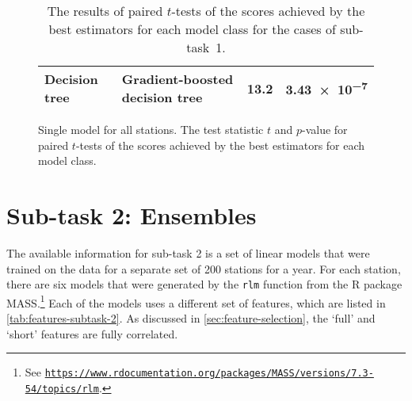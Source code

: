 \documentclass[11pt]{extarticle}
\begin{document}
\begin{table}
\begin{subfigure}{\textwidth}
\begin{tabular}{llrr}
      \\
      Decision tree & Gradient-boosted decision tree & 13.2          & \num{3.43e-7}
      \\
      \bottomrule
    \end{tabular}
    \caption{ Single model for all stations.
      The test statistic $t$ and $p$-value for paired $t$-tests of the scores achieved by the
      best estimators for each model class.
    }
    \label{tab:chart-subtask-1-t-tests-2}
  \end{subfigure}
  \caption{The results of paired $t$-tests of the scores achieved by the best
    estimators for each model class for the cases of sub-task~1.
  }
\end{table}

\section{Sub-task 2: Ensembles}
\label{sec:results-subtask-2}

The available information for sub-task 2 is a set of linear models that were trained on
the data for a separate set of 200 stations for a year.
For each station, there are six models that were generated by the \texttt{rlm} function
from the R package MASS.\footnote{See
  \href{https://www.rdocumentation.org/packages/MASS/versions/7.3-54/topics/rlm}{\texttt{https://www.rdocumentation.org/packages/MASS/versions/7.3-54/topics/rlm}}.
}
Each of the models uses a different set of features, which are listed in
\cref{tab:features-subtask-2}.
As discussed in \cref{sec:feature-selection}, the `full' and `short' features are fully
correlated.
\end{document}
